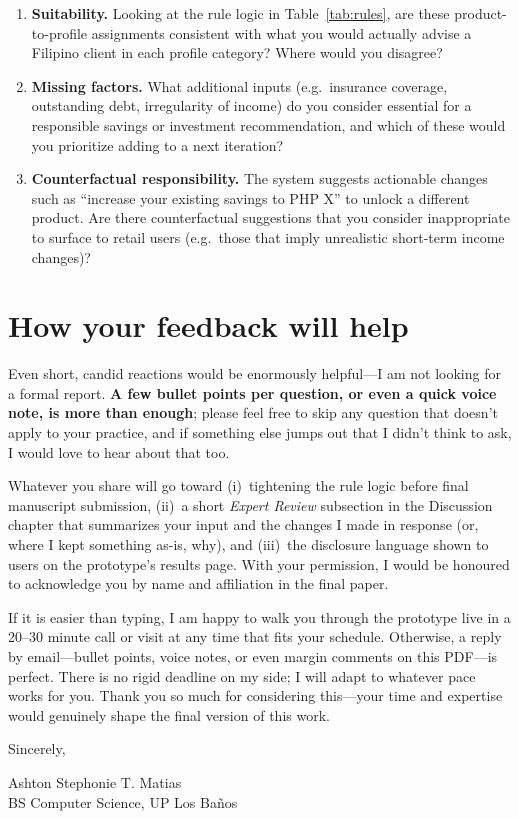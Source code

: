 \documentclass[11pt,a4paper]{article}
\begin{document}
\begin{enumerate}
    \item \textbf{Suitability.} Looking at the rule logic in
    Table~\ref{tab:rules}, are these product-to-profile assignments
    consistent with what you would actually advise a Filipino client in
    each profile category? Where would you disagree?
    \item \textbf{Missing factors.} What additional inputs (e.g.\
    insurance coverage, outstanding debt, irregularity of income) do you
    consider essential for a responsible savings or investment
    recommendation, and which of these would you prioritize adding to a
    next iteration?
    \item \textbf{Counterfactual responsibility.} The system suggests
    actionable changes such as ``increase your existing savings to PHP
    X'' to unlock a different product. Are there counterfactual
    suggestions that you consider inappropriate to surface to retail
    users (e.g.\ those that imply unrealistic short-term income changes)?
\end{enumerate}

\section*{How your feedback will help}

Even short, candid reactions would be enormously helpful---I am not looking
for a formal report. \textbf{A few bullet points per question, or even a
quick voice note, is more than enough}; please feel free to skip any
question that doesn't apply to your practice, and if something else jumps
out that I didn't think to ask, I would love to hear about that too.

Whatever you share will go toward (i)~tightening the rule logic before
final manuscript submission, (ii)~a short \emph{Expert Review} subsection
in the Discussion chapter that summarizes your input and the changes I
made in response (or, where I kept something as-is, why), and (iii)~the
disclosure language shown to users on the prototype's results page. With
your permission, I would be honoured to acknowledge you by name and
affiliation in the final paper.

If it is easier than typing, I am happy to walk you through the prototype
live in a 20--30 minute call or visit at any time that fits your schedule.
Otherwise, a reply by email---bullet points, voice notes, or even margin
comments on this PDF---is perfect. There is no rigid deadline on my side;
I will adapt to whatever pace works for you. Thank you so much for
considering this---your time and expertise would genuinely shape the final
version of this work.

\vspace{1.5em}

\noindent Sincerely,

\vspace{2em}

\noindent Ashton Stephonie T. Matias \\
\noindent BS Computer Science, UP Los Ba\~{n}os
\end{document}
